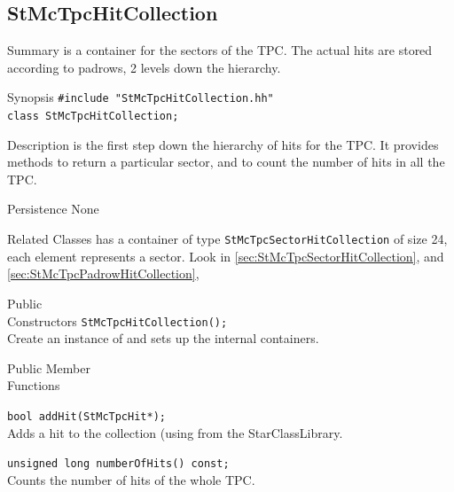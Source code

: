 \subsection{StMcTpcHitCollection}
 
\label{sec:StMcTpcHitCollection}
\begin{Entry}
\item[Summary]
     is a container for the
    sectors of the TPC.  The actual hits are stored according to
    padrows, 2 levels down the hierarchy.

\item[Synopsis]
    \verb+#include "StMcTpcHitCollection.hh"+\\
    \verb+class StMcTpcHitCollection;+\\

\item[Description]
     is the first step down
    the hierarchy of hits for the TPC.  It provides
    methods to return a particular sector, and to
    count the number of hits in all the TPC.

\item[Persistence]
    None

\item[Related Classes]
    has a container of type {\tt StMcTpcSectorHitCollection}
    of size 24, each element represents a sector.  Look in
     \ref{sec:StMcTpcSectorHitCollection},
    and  \ref{sec:StMcTpcPadrowHitCollection},

\item[Public\\ Constructors]
    \verb+StMcTpcHitCollection();+\\
    Create an instance of 
    and sets up the internal containers.

\item[Public Member\\ Functions]

    \verb+bool addHit(StMcTpcHit*);+\\
    Adds a hit to the collection (using 
    from the StarClassLibrary.

    \verb+unsigned long numberOfHits() const;+\\
    Counts the number of hits of the whole TPC.


\end{Entry}
